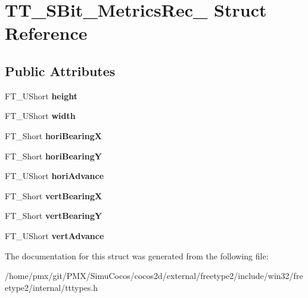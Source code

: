 \hypertarget{structTT__SBit__MetricsRec__}{}\section{T\+T\+\_\+\+S\+Bit\+\_\+\+Metrics\+Rec\+\_\+ Struct Reference}
\label{structTT__SBit__MetricsRec__}
\subsection*{Public Attributes}
\begin{DoxyCompactItemize}
\item 
\mbox{\label{structTT__SBit__MetricsRec___abf873bc8f20ef5e3f951035d004b111a}} 
F\+T\+\_\+\+U\+Short {\bfseries height}
\item 
\mbox{\label{structTT__SBit__MetricsRec___acbb91730fb9201741d0e33f16b38b815}} 
F\+T\+\_\+\+U\+Short {\bfseries width}
\item 
\mbox{\label{structTT__SBit__MetricsRec___a2f9707efc2af0e2f5c1366d06b36dc41}} 
F\+T\+\_\+\+Short {\bfseries hori\+BearingX}
\item 
\mbox{\label{structTT__SBit__MetricsRec___a6d1198143ff292d14036e630a1f5470c}} 
F\+T\+\_\+\+Short {\bfseries hori\+BearingY}
\item 
\mbox{\label{structTT__SBit__MetricsRec___a5e1c50427d7168f749afa3ae3a6c19b8}} 
F\+T\+\_\+\+U\+Short {\bfseries hori\+Advance}
\item 
\mbox{\label{structTT__SBit__MetricsRec___a8f9290fe72d470b5a3d1b3cf51e50c78}} 
F\+T\+\_\+\+Short {\bfseries vert\+BearingX}
\item 
\mbox{\label{structTT__SBit__MetricsRec___a1b3240b24ca4acf498b803a84aa659ec}} 
F\+T\+\_\+\+Short {\bfseries vert\+BearingY}
\item 
\mbox{\label{structTT__SBit__MetricsRec___afdef8b583a6e7925727a6ff707f33051}} 
F\+T\+\_\+\+U\+Short {\bfseries vert\+Advance}
\end{DoxyCompactItemize}


The documentation for this struct was generated from the following file\+:\begin{DoxyCompactItemize}
\item 
/home/pmx/git/\+P\+M\+X/\+Simu\+Cocos/cocos2d/external/freetype2/include/win32/freetype2/internal/tttypes.\+h\end{DoxyCompactItemize}
